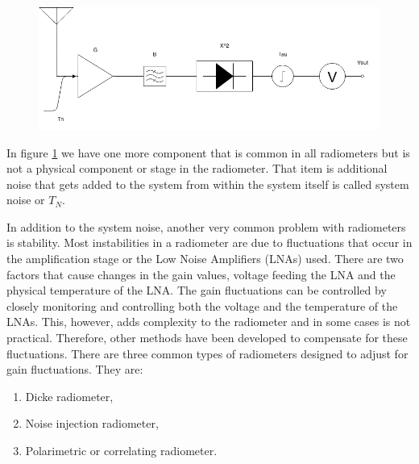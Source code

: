{\begin{figure}[h!tb] 
\centering
\includegraphics[width=\textwidth]{Images/Radiometer.png}
\label{trad_radiometer}
\end{figure}
}

In figure \ref{trad_radiometer} we have one more component that is common in all radiometers but is not a physical component or stage in the radiometer.  That item is additional noise that gets added to the system from within the system itself is called system noise or $T_{N}$.

In addition to the system noise, another very common problem with radiometers is stability.  Most instabilities in a radiometer are due to fluctuations that occur in the amplification stage or the Low Noise Amplifiers (LNAs) used. There are two factors that cause changes in the gain values, voltage feeding the LNA and the physical temperature of the LNA.  The gain fluctuations can be controlled by closely monitoring and controlling both the voltage and the temperature of the LNAs. This, however, adds complexity to the radiometer and in some cases is not practical.  Therefore, other methods have been developed to compensate for these fluctuations.  There are three common types of radiometers designed to adjust for gain fluctuations.  They are:

\begin{enumerate}
\item Dicke radiometer,
\item Noise injection radiometer,
\item Polarimetric or correlating radiometer.
\end{enumerate}


